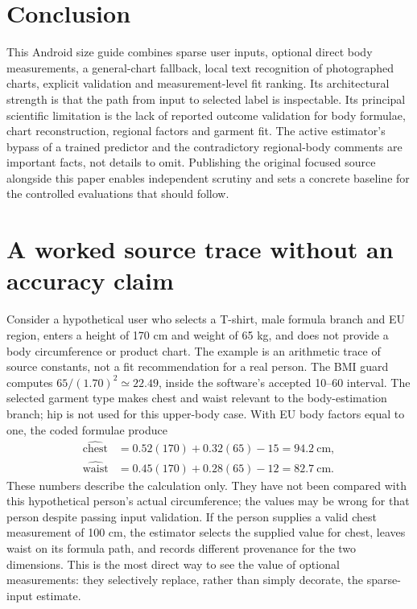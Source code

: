 \documentclass[11pt,a4paper]{article}
\begin{document}
\section{Conclusion}
This Android size guide combines sparse user inputs, optional direct body measurements, a general-chart fallback, local text recognition of photographed charts, explicit validation and measurement-level fit ranking. Its architectural strength is that the path from input to selected label is inspectable. Its principal scientific limitation is the lack of reported outcome validation for body formulae, chart reconstruction, regional factors and garment fit. The active estimator's bypass of a trained predictor and the contradictory regional-body comments are important facts, not details to omit. Publishing the original focused source alongside this paper enables independent scrutiny and sets a concrete baseline for the controlled evaluations that should follow.

\appendix
\section{A worked source trace without an accuracy claim}
Consider a hypothetical user who selects a T-shirt, male formula branch and EU region, enters a height of 170 cm and weight of 65 kg, and does not provide a body circumference or product chart. The example is an arithmetic trace of source constants, not a fit recommendation for a real person. The BMI guard computes $65/(1.70)^2\simeq22.49$, inside the software's accepted 10--60 interval. The selected garment type makes chest and waist relevant to the body-estimation branch; hip is not used for this upper-body case. With EU body factors equal to one, the coded formulae produce
\begin{align}
\widehat{\mathrm{chest}} &= 0.52(170)+0.32(65)-15 = 94.2\ \mathrm{cm},\\
\widehat{\mathrm{waist}} &= 0.45(170)+0.28(65)-12 = 82.7\ \mathrm{cm}.
\end{align}
These numbers describe the calculation only. They have not been compared with this hypothetical person's actual circumference; the values may be wrong for that person despite passing input validation. If the person supplies a valid chest measurement of 100 cm, the estimator selects the supplied value for chest, leaves waist on its formula path, and records different provenance for the two dimensions. This is the most direct way to see the value of optional measurements: they selectively replace, rather than simply decorate, the sparse-input estimate.
\end{document}
